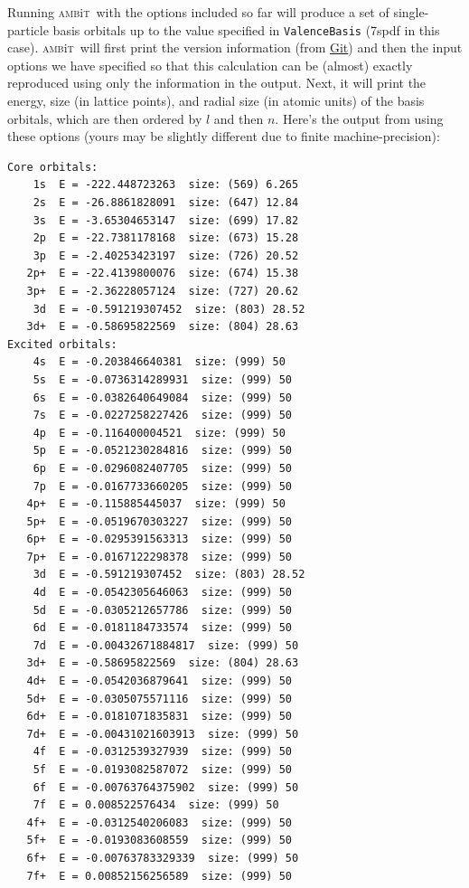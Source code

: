 \documentclass{report}
\newcommand{\ambit}{\textsc{amb}{\footnotesize i}\textsc{t}}
\begin{document}
Running \ambit\  with the options included so far will produce a set of single-particle basis orbitals up
to the value specified in \texttt{ValenceBasis} (7spdf in this case). \ambit\  will first print the 
version information (from \href{https://git-scm.com/}{Git}) and then the input options we have specified
so that this calculation can be (almost) exactly reproduced using only the information in the output.
Next, it will print the energy, size (in lattice points), and radial size (in atomic units) of the basis
orbitals, which are then ordered by $l$ and then $n$. Here's the output from using these options (yours
may be slightly different due to finite machine-precision):

\begin{verbatim}
Core orbitals: 
    1s  E = -222.448723263  size: (569) 6.265
    2s  E = -26.8861828091  size: (647) 12.84
    3s  E = -3.65304653147  size: (699) 17.82
    2p  E = -22.7381178168  size: (673) 15.28
    3p  E = -2.40253423197  size: (726) 20.52
   2p+  E = -22.4139800076  size: (674) 15.38
   3p+  E = -2.36228057124  size: (727) 20.62
    3d  E = -0.591219307452  size: (803) 28.52
   3d+  E = -0.58695822569  size: (804) 28.63
Excited orbitals: 
    4s  E = -0.203846640381  size: (999) 50
    5s  E = -0.0736314289931  size: (999) 50
    6s  E = -0.0382640649084  size: (999) 50
    7s  E = -0.0227258227426  size: (999) 50
    4p  E = -0.116400004521  size: (999) 50
    5p  E = -0.0521230284816  size: (999) 50
    6p  E = -0.0296082407705  size: (999) 50
    7p  E = -0.0167733660205  size: (999) 50
   4p+  E = -0.115885445037  size: (999) 50
   5p+  E = -0.0519670303227  size: (999) 50
   6p+  E = -0.0295391563313  size: (999) 50
   7p+  E = -0.0167122298378  size: (999) 50
    3d  E = -0.591219307452  size: (803) 28.52
    4d  E = -0.0542305646063  size: (999) 50
    5d  E = -0.0305212657786  size: (999) 50
    6d  E = -0.0181184733574  size: (999) 50
    7d  E = -0.00432671884817  size: (999) 50
   3d+  E = -0.58695822569  size: (804) 28.63
   4d+  E = -0.0542036879641  size: (999) 50
   5d+  E = -0.0305075571116  size: (999) 50
   6d+  E = -0.0181071835831  size: (999) 50
   7d+  E = -0.00431021603913  size: (999) 50
    4f  E = -0.0312539327939  size: (999) 50
    5f  E = -0.0193082587072  size: (999) 50
    6f  E = -0.00763764375902  size: (999) 50
    7f  E = 0.008522576434  size: (999) 50
   4f+  E = -0.0312540206083  size: (999) 50
   5f+  E = -0.0193083608559  size: (999) 50
   6f+  E = -0.00763783329339  size: (999) 50
   7f+  E = 0.00852156256589  size: (999) 50
\end{verbatim}
\end{document}
